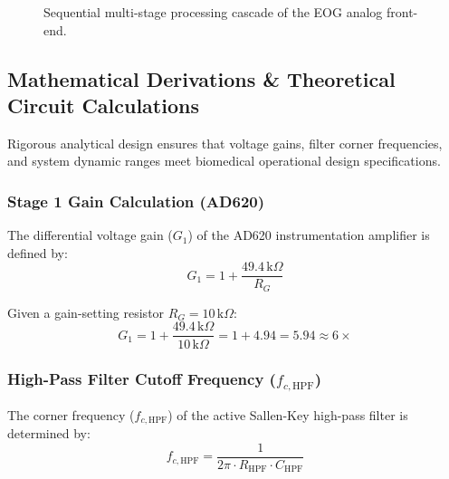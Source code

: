 \begin{figure}[H]
{%
  }
  \caption{Sequential multi-stage processing cascade of the EOG analog front-end.}
  \label{fig:afe_processing_cascade}
\end{figure}

\FloatBarrier
\subsection{Mathematical Derivations \& Theoretical Circuit Calculations}
\label{subsec:mathematical_derivations_calculations}

Rigorous analytical design ensures that voltage gains, filter corner frequencies, and system dynamic ranges meet biomedical operational design specifications.

\FloatBarrier
\subsubsection{Stage 1 Gain Calculation (AD620)}
\label{subsubsec:stage1_gain_calc}

The differential voltage gain ($G_1$) of the AD620 instrumentation amplifier is defined by:
\begin{equation}
G_1 = 1 + \frac{49.4\,\text{k}\Omega}{R_G}
\label{eq:ad620_gain_formula}
\end{equation}

Given a gain-setting resistor $R_G = 10\,\text{k}\Omega$:
\begin{equation}
G_1 = 1 + \frac{49.4\,\text{k}\Omega}{10\,\text{k}\Omega} = 1 + 4.94 = 5.94 \approx 6\times
\label{eq:ad620_gain_result}
\end{equation}

\FloatBarrier
\subsubsection{\texorpdfstring{High-Pass Filter Cutoff Frequency ($f_{c,\text{HPF}}$)}{High-Pass Filter Cutoff Frequency (fc,HPF)}}
\label{subsubsec:hpf_cutoff_calc}

The corner frequency ($f_{c,\text{HPF}}$) of the active Sallen-Key high-pass filter is determined by:
\begin{equation}
f_{c,\text{HPF}} = \frac{1}{2\pi \cdot R_{\text{HPF}} \cdot C_{\text{HPF}}}
\label{eq:hpf_formula}
\end{equation}

